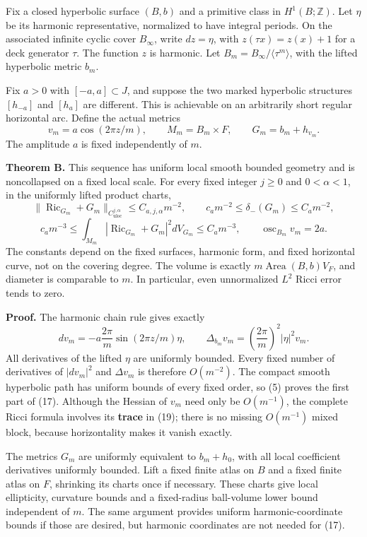 \documentclass[
  11pt,
]{article}
\begin{document}
Fix a closed hyperbolic surface \((B,b)\) and a primitive class in
\(H^1(B;\mathbb Z)\). Let \(\eta\) be its harmonic representative,
normalized to have integral periods. On the associated infinite cyclic
cover \(B_\infty\), write \(dz=\eta\), with \(z(\tau x)=z(x)+1\) for a
deck generator \(\tau\). The function \(z\) is harmonic. Let
\(B_m=B_\infty/\langle\tau^m\rangle\), with the lifted hyperbolic metric
\(b_m\).

Fix \(a>0\) with \([-a,a]\subset J\), and suppose the two marked
hyperbolic structures \([h_{-a}]\) and \([h_a]\) are different. This is
achievable on an arbitrarily short regular horizontal arc. Define the
actual metrics \[
 v_m=a\cos(2\pi z/m),\qquad
 M_m=B_m\times F,\qquad G_m=b_m+h_{v_m}.
 \tag{16}
\] The amplitude \(a\) is fixed independently of \(m\).

\textbf{Theorem B.} This sequence has uniform local smooth bounded
geometry and is noncollapsed on a fixed local scale. For every fixed
integer \(j\ge0\) and \(0<\alpha<1\), in the uniformly lifted product
charts, \[
 \|\operatorname{Ric}_{G_m}+G_m\|_{C^{j,\alpha}_{\mathrm{uloc}}}
                  \le C_{a,j,\alpha}m^{-2},
 \qquad
 c_a m^{-2}\le\delta_-(G_m)\le C_a m^{-2},
 \tag{17}
\] \[
 c_a m^{-3}\le
       \int_{M_m}|\operatorname{Ric}_{G_m}+G_m|^2dV_{G_m}
                 \le C_a m^{-3},\qquad
 \operatorname{osc}_{B_m}v_m=2a.
 \tag{18}
\] The constants depend on the fixed surfaces, harmonic form, and fixed
horizontal curve, not on the covering degree. The volume is exactly
\(m\operatorname{Area}(B,b)V_F\), and diameter is comparable to \(m\).
In particular, even unnormalized \(L^2\) Ricci error tends to zero.

\textbf{Proof.} The harmonic chain rule gives exactly \[
 dv_m=-a\frac{2\pi}{m}\sin(2\pi z/m)\eta,
 \qquad
 \Delta_{b_m}v_m=\left(\frac{2\pi}{m}\right)^2
                                      |\eta|^2v_m.
 \tag{19}
\] All derivatives of the lifted \(\eta\) are uniformly bounded. Every
fixed number of derivatives of \(|dv_m|^2\) and \(\Delta v_m\) is
therefore \(O(m^{-2})\). The compact smooth hyperbolic path has uniform
bounds of every fixed order, so (5) proves the first part of (17).
Although the Hessian of \(v_m\) need only be \(O(m^{-1})\), the complete
Ricci formula involves its \textbf{trace} in (19); there is no missing
\(O(m^{-1})\) mixed block, because horizontality makes it vanish
exactly.

The metrics \(G_m\) are uniformly equivalent to \(b_m+h_0\), with all
local coefficient derivatives uniformly bounded. Lift a fixed finite
atlas on \(B\) and a fixed finite atlas on \(F\), shrinking its charts
once if necessary. These charts give local ellipticity, curvature bounds
and a fixed-radius ball-volume lower bound independent of \(m\). The
same argument provides uniform harmonic-coordinate bounds if those are
desired, but harmonic coordinates are not needed for (17).
\end{document}
